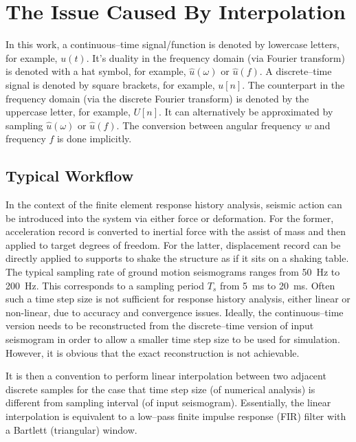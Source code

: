 \section{The Issue Caused By Interpolation}
In this work, a continuous--time signal/function is denoted by lowercase letters, for example, $u\left(t\right)$. It's duality in the frequency domain (via Fourier transform) is denoted with a hat symbol, for example, $\hat{u}\left(\omega\right)$ or $\hat{u}\left(f\right)$. A discrete--time signal is denoted by square brackets, for example, $u[n]$. The counterpart in the frequency domain (via the discrete Fourier transform) is denoted by the uppercase letter, for example, $U[n]$. It can alternatively be approximated by sampling $\hat{u}\left(\omega\right)$ or $\hat{u}\left(f\right)$. The conversion between angular frequency $w$ and frequency $f$ is done implicitly.
\subsection{Typical Workflow}
In the context of the finite element response history analysis, seismic action can be introduced into the system via either force or deformation. For the former, acceleration record is converted to inertial force with the assist of mass and then applied to target degrees of freedom. For the latter, displacement record can be directly applied to supports to shake the structure as if it sits on a shaking table.
The typical sampling rate of ground motion seismograms ranges from \SI{50}{\hertz} to \SI{200}{\hertz}. This corresponds to a sampling period $T_s$ from \SI{5}{\milli\second} to \SI{20}{\milli\second}. Often such a time step size is not sufficient for response history analysis, either linear or non-linear, due to accuracy and convergence issues. Ideally, the continuous--time version needs to be reconstructed from the discrete--time version of input seismogram in order to allow a smaller time step size to be used for simulation. However, it is obvious that the exact reconstruction is not achievable.

It is then a convention to perform linear interpolation between two adjacent discrete samples for the case that time step size (of numerical analysis) is different from sampling interval (of input seismogram). Essentially, the linear interpolation is equivalent to a low--pass finite impulse response (FIR) filter with a Bartlett (triangular) window.

